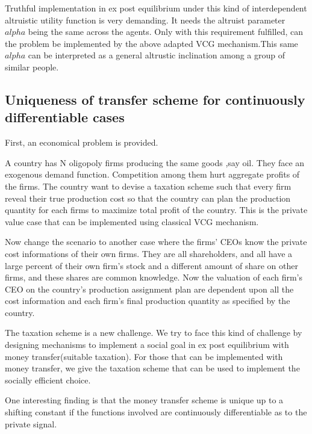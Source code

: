  \begin{remark}
   Truthful implementation in ex post equilibrium under this kind of interdependent altruistic utility function is very demanding. It needs the altruist parameter $alpha$ being the same across the agents. Only with this requirement fulfilled, can the problem be implemented by the above adapted VCG mechanism.This same $alpha$ can be interpreted as a general altrustic inclination among a group of similar people. 
 \end{remark}

 
 \subsection{Uniqueness of transfer scheme for continuously differentiable cases}

First, an economical problem is provided. 
\begin{example}
A country has N oligopoly firms producing the same goods ,say oil. They face an exogenous demand function. Competition among them hurt
aggregate profits of the firms. 
The country want to devise a taxation scheme such that every firm reveal their true production cost so that the country can plan
the production quantity for each firms to maximize total profit of the country. This is the private value case that can be implemented
using classical VCG mechanism. 

Now change the scenario to another case where the firms' CEOs know the private cost informations of their own firms. They are all 
shareholders, and all have a large percent of their own firm's stock and a different amount of share on other firms, and these shares
are common knowledge.  Now the valuation of each firm's CEO on the country's production assignment plan are dependent upon all
the cost information and each firm's final production quantity as specified by the country.
\end{example}
 
The taxation scheme is a new challenge. We try to face this kind of challenge by designing mechanisms to implement a social goal in ex post equilibrium with money transfer(suitable taxation). For those that can be implemented with money transfer, we give the taxation scheme that can be used to implement the socially efficient choice.

One interesting finding is that the money transfer scheme is unique up to a shifting constant if the functions involved are
continuously differentiable as to the private signal.

